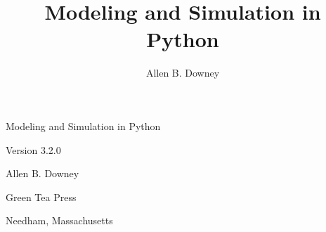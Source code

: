 \documentclass[12pt]{book}
\title{Modeling and Simulation in Python}
\author{Allen B. Downey}
\newcommand{\thetitle}{Modeling and Simulation in Python}
\newcommand{\theauthors}{Allen B. Downey}
\newcommand{\theversion}{3.2.0}
\theoremstyle{exercise}
\newcommand\blankpage{%
    \null
    \thispagestyle{empty}%
    \addtocounter{page}{-1}%
    \newpage}
\newif\ifplastex
\begin{document}
\frontmatter

\ifplastex

\maketitle

\else

\begin{latexonly}

%
%
%
%
%
%




\pagebreak
\thispagestyle{empty}

\begin{flushright}
\vspace*{2.0in}

\begin{spacing}{3}
{\huge \thetitle}
\end{spacing}

\vspace{0.25in}

Version \theversion

\vspace{1in}


{\Large
\theauthors \\
}


\vspace{0.5in}

{\Large Green Tea Press}

{\small Needham, Massachusetts}

\vfill

\end{flushright}




\end{latexonly}
\end{document}

